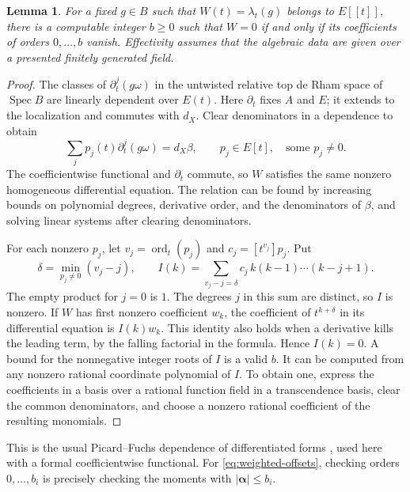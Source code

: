 \documentclass[11pt]{article}
\newtheorem{lemma}[theorem]{Lemma}
\begin{document}
\begin{lemma}\label{lem:ode}
For a fixed \(g\in B\) such that \(W(t)=\lambda_t(g)\) belongs to
\(E[[t]]\), there is a computable integer \(b\ge0\) such that \(W=0\)
if and only if its coefficients of orders \(0,\ldots,b\) vanish.
Effectivity assumes that the algebraic data are given over a
presented finitely generated field.
\end{lemma}

\begin{proof}
The classes of \(\partial_t^j(g\omega)\) in the untwisted relative
top de Rham space of \(\operatorname{Spec} B\) are linearly dependent
over \(E(t)\). Here \(\partial_t\) fixes \(A\) and \(E\); it extends
to the localization and commutes with \(d_X\). Clear denominators
in a dependence to obtain
\[
             \sum_j p_j(t)\partial_t^j(g\omega)=d_X\beta,
             \qquad p_j\in E[t],\quad \text{some }p_j\ne0 .
\]
The coefficientwise functional and \(\partial_t\) commute, so \(W\)
satisfies the same nonzero homogeneous differential equation.
The relation can be found by increasing bounds on polynomial degrees,
derivative order, and the denominators of \(\beta\), and solving linear
systems after clearing denominators.

For each nonzero \(p_j\), let \(v_j=\operatorname{ord}_t(p_j)\)
and \(c_j=[t^{v_j}]p_j\). Put
\[
  \delta=\min_{p_j\ne0}(v_j-j),\qquad
  I(k)=\sum_{v_j-j=\delta}c_j\,k(k-1)\cdots(k-j+1).
\]
The empty product for \(j=0\) is \(1\). The degrees \(j\) in this sum
are distinct, so \(I\) is nonzero. If \(W\) has first nonzero
coefficient \(w_k\), the coefficient of \(t^{k+\delta}\) in its
differential equation is \(I(k)w_k\). This identity also holds when a
derivative kills the leading term, by the falling factorial in the
formula. Hence \(I(k)=0\). A bound for the nonnegative integer roots
of \(I\) is a valid \(b\). It can be computed from any nonzero
rational coordinate polynomial of \(I\). To obtain one, express
the coefficients in a basis over a rational function field in a
transcendence basis, clear the common denominators, and choose a
nonzero rational coefficient of the resulting monomials.
\end{proof}

This is the usual Picard--Fuchs dependence of differentiated forms
\cite{Lairez}, used here with a formal coefficientwise functional.
For \eqref{eq:weighted-offsets}, checking orders \(0,\ldots,b_i\)
is precisely checking the moments with \(|\boldsymbol\alpha|\le b_i\).
\end{document}
